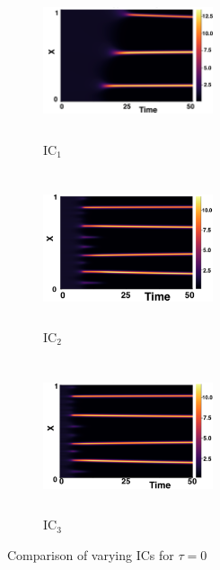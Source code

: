 \begin{figure}[H]
    \centering
    \begin{subfigure}[b]{0.32\textwidth}
        \centering
        \includegraphics[width=5cm,height=4.5cm]{gaff0.png}
        \caption{$\text{IC}_1$}
        \label{}
    \end{subfigure}
    \hfill
    \begin{subfigure}[b]{0.32\textwidth}
        \centering
        \includegraphics[width=5cm,height=4.5cm]{ic20.png}
        \caption{$\text{IC}_2$}
        \label{}
    \end{subfigure}
    \hfill
    \begin{subfigure}[b]{0.32\textwidth}
        \centering
        \includegraphics[width=5cm,height=4.5cm]{ic30.png}
        \caption{$\text{IC}_3$}
        \label{}
    \end{subfigure}
    \caption{Comparison of varying ICs for $\tau=0$}
    \label{fig:figtau0}
\end{figure}
